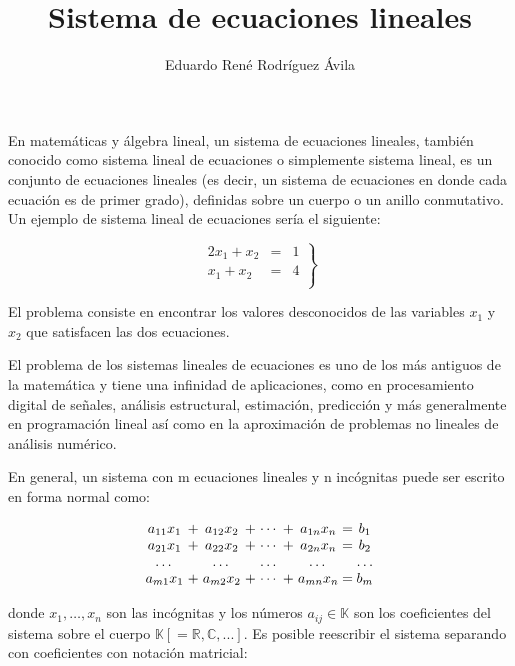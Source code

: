 \documentclass[12pt,letterpaper]{article}
\title{Sistema de ecuaciones lineales}
\author{Eduardo René Rodríguez Ávila}
\begin{document}
\maketitle

En matemáticas y álgebra lineal, un sistema de ecuaciones lineales, también conocido como sistema lineal de ecuaciones o simplemente sistema lineal, es un conjunto de ecuaciones lineales (es decir, un sistema de ecuaciones en donde cada ecuación es de primer grado), definidas sobre un cuerpo o un anillo conmutativo. Un ejemplo de sistema lineal de ecuaciones sería el siguiente:

\[
\left .
\begin{array}{rcc}
	2x_1  +  x_2 & = & 1 \\
	x_1  +  x_2 & = & 4 \\
\end{array}
\right \} 
\]

El problema consiste en encontrar los valores desconocidos de las variables $x_1$ y $x_2$ que satisfacen las dos ecuaciones.

El problema de los sistemas lineales de ecuaciones es uno de los más antiguos de la matemática y tiene una infinidad de aplicaciones, como en procesamiento digital de señales, análisis estructural, estimación, predicción y más generalmente en programación lineal así como en la aproximación de problemas no lineales de análisis numérico.

En general, un sistema con m ecuaciones lineales y n incógnitas puede ser escrito en forma normal como:

\[  
\setlength\arraycolsep{1.5pt}
\begin{array}{ccc ccc c @{\extracolsep{2.5pt}}c@{\extracolsep{2.5pt}}c}
	a_{11}x_1 & + & a_{12}x_2 & + & \cdots & + & a_{1n}x_n & = & b_1 \\
	a_{21}x_1 & + & a_{22}x_2 & + & \cdots & + & a_{2n}x_n & = & b_2 \\
	\dots & & \dots & & \dots & &  \dots & &  \dots \\
	a_{m1}x_1 & + & a_{m2}x_2 & + & \cdots & + & a_{mn}x_n & = & b_m \\
\end{array}
\]


\noindent donde $x_1,\dots,x_n$ son las incógnitas y los números  $ a_{ij} \in \mathbb{K} $  son los co\-e\-fi\-ci\-en\-tes del sistema sobre el cuerpo $\mathbb{K} [= \mathbb{R}, \mathbb{C}, ...]$. Es posible reescribir el sistema separando con coeficientes con notación matricial:
\end{document}

